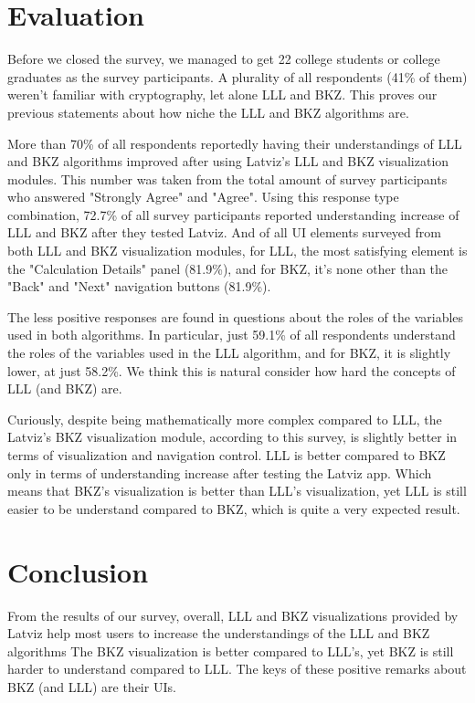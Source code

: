 \documentclass[runningheads]{llncs}
\begin{document}
\FloatBarrier
\section{Evaluation}
Before we closed the survey, we managed to get 22 college students or college graduates as the survey participants. A plurality of all respondents (41\% of them) weren't familiar with cryptography, let alone LLL and BKZ. This proves our previous statements about how niche the LLL and BKZ algorithms are. 

More than 70\% of all respondents reportedly having their understandings of LLL and BKZ algorithms improved after using Latviz's LLL and BKZ visualization modules. This number was taken from the total amount of survey participants who answered "Strongly Agree" and "Agree". Using this response type combination, 72.7\% of all survey participants reported understanding increase of LLL and BKZ after they tested Latviz. And of all UI elements surveyed from both LLL and BKZ visualization modules, for LLL, the most satisfying element is the "Calculation Details" panel (81.9\%), and for BKZ, it's none other than the "Back" and "Next" navigation buttons (81.9\%). 

The less positive responses are found in questions about the roles of the variables used in both algorithms. In particular, just 59.1\% of all respondents understand the roles of the variables used in the LLL algorithm, and for BKZ, it is slightly lower, at just 58.2\%. We think this is natural consider how hard the concepts of LLL (and BKZ) are.

Curiously, despite being mathematically more complex compared to LLL, the Latviz's BKZ visualization module, according to this survey, is slightly better in terms of visualization and navigation control. LLL is better compared to BKZ only in terms of understanding increase after testing the Latviz app. Which means that BKZ's visualization is better than LLL's visualization, yet LLL is still easier to be understand compared to BKZ, which is quite a very expected result.

\section{Conclusion}
From the results of our survey, overall, LLL and BKZ visualizations provided by Latviz help most users to increase the understandings of the LLL and BKZ algorithms The BKZ visualization is better compared to LLL's, yet BKZ is still harder to understand compared to LLL. The keys of these positive remarks about BKZ (and LLL) are their UIs. 
\end{document}

